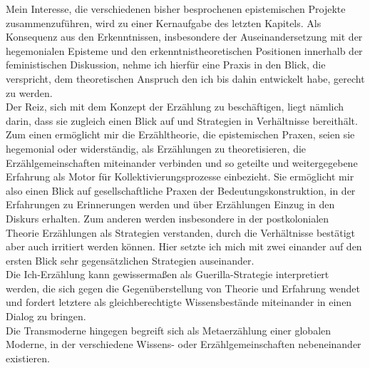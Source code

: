 Mein Interesse, die verschiedenen bisher besprochenen epistemischen Projekte
zusammenzuführen, wird zu einer Kernaufgabe des letzten Kapitels. Als Konsequenz
aus den Erkenntnissen, insbesondere der Auseinandersetzung mit der hegemonialen
Episteme und den erkenntnistheoretischen Positionen innerhalb der feministischen
Diskussion,  nehme ich hierfür eine Praxis in den Blick, die verspricht, dem
theoretischen Anspruch den ich bis dahin entwickelt habe, gerecht zu werden.\\
 Der
Reiz, sich mit dem Konzept der Erzählung zu beschäftigen, liegt nämlich darin,
dass sie zugleich einen Blick auf und Strategien in Verhältnisse bereithält. \\
Zum
einen ermöglicht mir die Erzähltheorie, die epistemischen Praxen, seien sie
hegemonial oder widerständig, als Erzählungen zu theoretisieren, die
Erzählgemeinschaften miteinander verbinden und so geteilte und weitergegebene
Erfahrung als Motor für Kollektivierungsprozesse einbezieht. Sie ermöglicht mir
also einen Blick auf gesellschaftliche Praxen der Bedeutungskonstruktion, in der
Erfahrungen zu Erinnerungen werden und über Erzählungen Einzug in den Diskurs
erhalten. Zum anderen werden insbesondere in der postkolonialen Theorie
Erzählungen als Strategien verstanden, durch die Verhältnisse bestätigt aber
auch irritiert werden können. Hier setzte ich mich mit zwei einander auf den
ersten Blick sehr gegensätzlichen Strategien auseinander. \\
Die Ich-Erzählung kann
gewissermaßen als Guerilla-Strategie interpretiert werden, die sich gegen die
Gegenüberstellung von Theorie und Erfahrung wendet und fordert letztere als
gleichberechtigte Wissensbestände miteinander in einen Dialog zu bringen. \\
Die
Transmoderne hingegen begreift sich als Metaerzählung einer globalen Moderne, in
der verschiedene Wissens- oder Erzählgemeinschaften nebeneinander existieren.\\

